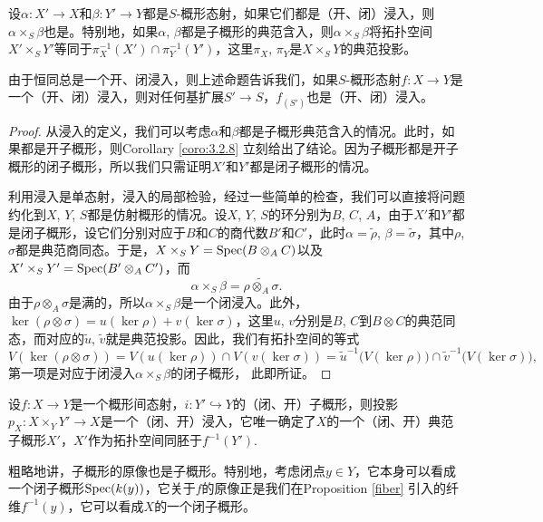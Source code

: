 \begin{pro}
设$\alpha:X'\to X$和$\beta:Y'\to Y$都是$S$-概形态射，如果它们都是（开、闭）浸入，则$\alpha\times_S\beta$也是。特别地，如果$\alpha$, $\beta$都是子概形的典范含入，则$\alpha\times_S \beta$将拓扑空间$X'\times_S Y'$等同于$\pi_X^{-1}(X')\cap \pi_Y^{-1}(Y')$，这里$\pi_X$, $\pi_Y$是$X\times_S Y$的典范投影。
\end{pro}

由于恒同总是一个开、闭浸入，则上述命题告诉我们，如果$S$-概形态射$f:X\to Y$是一个（开、闭）浸入，则对任何基扩展$S'\to S$，$f_{(S')}$也是（开、闭）浸入。

\begin{proof}
从浸入的定义，我们可以考虑$\alpha$和$\beta$都是子概形典范含入的情况。此时，如果都是开子概形，则Corollary \ref{coro:3.2.8} 立刻给出了结论。因为子概形都是开子概形的闭子概形，所以我们只需证明$X'$和$Y'$都是闭子概形的情况。

利用浸入是单态射，浸入的局部检验，经过一些简单的检查，我们可以直接将问题约化到$X$, $Y$, $S$都是仿射概形的情况。设$X$, $Y$, $S$的环分别为$B$, $C$, $A$，由于$X'$和$Y'$都是闭子概形，设它们分别对应于$B$和$C$的商代数$B'$和$C'$，此时$\alpha=\widetilde{\rho}$, $\beta=\widetilde{\sigma}$，其中$\rho$, $\sigma$都是典范商同态。于是，$X\times_S Y=\operatorname{Spec}(B\otimes_A C)$以及$X'\times_S Y'=\operatorname{Spec}(B'\otimes_A C')$，而
\[
	\alpha\times_S\beta=\widetilde{\rho\otimes_A\sigma}.
\]
由于$\rho\otimes_A\sigma$是满的，所以$\alpha\times_S\beta$是一个闭浸入。此外，$\ker(\rho\otimes \sigma)=u(\ker \rho)+v(\ker \sigma)$，这里$u$, $v$分别是$B$, $C$到$B\otimes C$的典范同态，而对应的$\widetilde{u}$, $\widetilde{v}$就是典范投影。因此，我们有拓扑空间的等式
\[
	V(\ker(\rho\otimes \sigma))=V(u(\ker\rho))\cap V(v(\ker\sigma))=\widetilde{u}^{-1}\bigl(V(\ker\rho)\bigr)\cap \widetilde{v}^{-1}\bigl(V(\ker \sigma)\bigr),
\]
第一项是对应于闭浸入$\alpha\times_S \beta$的闭子概形，
此即所证。
\end{proof}

\begin{pro}[子概形的原像]
设$f:X\to Y$是一个概形间态射，$i:Y'\hookrightarrow Y$的（闭、开）子概形，则投影$p_X:X\times_Y Y'\to X$是一个（闭、开）浸入，它唯一确定了$X$的一个（闭、开）典范子概形$X'$，$X'$作为拓扑空间同胚于$f^{-1}(Y')$.
\end{pro}

粗略地讲，子概形的原像也是子概形。特别地，考虑闭点$y\in Y$，它本身可以看成一个闭子概形$\operatorname{Spec} (k(y))$，它关于$f$的原像正是我们在Proposition \ref{fiber} 引入的纤维$f^{-1}(y)$，它可以看成$X$的一个闭子概形。     

